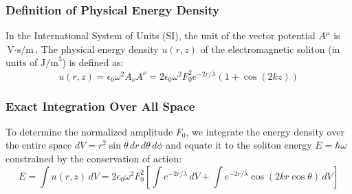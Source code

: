 \documentclass[12pt, a4paper]{article}
\begin{document}
\subsubsection{Definition of Physical Energy Density}

In the International System of Units (SI), the unit of the vector potential $A^\mu$ is $\text{V}\cdot\text{s/m}$. The physical energy density $u(r, z)$ of the electromagnetic soliton (in units of $\text{J/m}^3$) is defined as:
\begin{equation}
u(r, z) = \epsilon_0 \omega^2 A_\nu A^\nu = 2 \epsilon_0 \omega^2 F_0^2 e^{-2r/\bar{\lambda}} \left(1 + \cos(2kz)\right)
\end{equation}

\subsubsection{Exact Integration Over All Space}

To determine the normalized amplitude $F_0$, we integrate the energy density over the entire space $dV = r^2 \sin\theta \, dr \, d\theta \, d\phi$ and equate it to the soliton energy $E = \hbar\omega$ constrained by the conservation of action:
\begin{equation}
E = \int u(r, z) \, dV = 2 \epsilon_0 \omega^2 F_0^2 \left[ \int e^{-2r/\bar{\lambda}} \, dV + \int e^{-2r/\bar{\lambda}} \cos(2kr\cos\theta) \, dV \right]
\end{equation}
\end{document}
